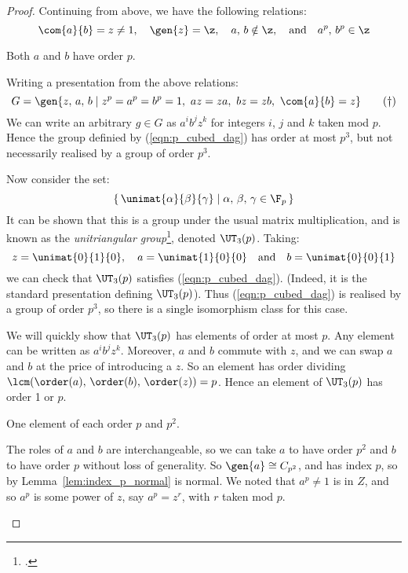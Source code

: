 \begin{proof}
Continuing from above, we have the following relations:
\[ \com{a}{b} = z \neq 1, \quad \gen{z} = \z, \quad a,\,b \notin \z, \quad \text{and} \quad a^p,\,b^p \in \z \]

\begin{case}
    \item Both \(a\) and \(b\) have order \(p\).

        Writing a presentation from the above relations:
        \[G = \gen{z,\,a,\,b \mid z^p = a^p = b^p = 1,\ az = za,\ bz = zb,\ \com{a}{b} = z} \tag{\dag}\label{eqn:p_cubed_dag}\]
        We can write an arbitrary \(g \in G\) as \(a^i b^j z^k\) for integers \(i\), \(j\) and \(k\) taken mod \(p\).
        Hence the group definied by (\ref{eqn:p_cubed_dag}) has order at most \(p^3\), but not necessarily realised by a group of order \(p^3\).

        Now consider the set:
        \[\left\{\,\unimat{\alpha}{\beta}{\gamma} \mid \alpha,\,\beta,\,\gamma \in \F_p\,\right\}\]
        It can be shown that this is a group under the usual matrix multiplication, and is known as the
        \emph{unitriangular group}\footcite{unitriangular}, denoted \(\UT_3(p)\).
        Taking:
        \[z = \unimat{0}{1}{0}, \quad a = \unimat{1}{0}{0} \quad \text{and} \quad b = \unimat{0}{0}{1}\]
        we can check that \(\UT_3(p)\) satisfies (\ref{eqn:p_cubed_dag}).
        (Indeed, it is the standard presentation defining \(\UT_3(p)\)).
        Thus (\ref{eqn:p_cubed_dag}) is realised by a group of order \(p^3\), so there is a single isomorphism class for
        this case.

        We will quickly show that \(\UT_3(p)\) has elements of order at most \(p\).
        Any element can be written as \(a^i b^j z^k\).
        Moreover, \(a\) and \(b\) commute with \(z\), and we can swap \(a\) and \(b\) at the price of introducing a
        \(z\).
        So an element has order dividing \(\lcm(\order(a),\, \order(b),\, \order(z)) = p\).
        Hence an element of \(\UT_3(p)\) has order 1 or \(p\).

    \item One element of each order \(p\) and \(p^2\).

        The roles of \(a\) and \(b\) are interchangeable, so we can take \(a\) to have order \(p^2\) and \(b\) to have
        order \(p\) without loss of generality.
        So \(\gen{a} \cong C_{p^2}\), and has index \(p\), so by Lemma~\ref{lem:index_p_normal} is normal.
        We noted that \(a^p \neq 1\) is in \(Z\), and so \(a^p\) is some power of \(z\), say \(a^p = z^r\), with \(r\)
        taken mod \(p\).


\end{case}
\end{proof}
